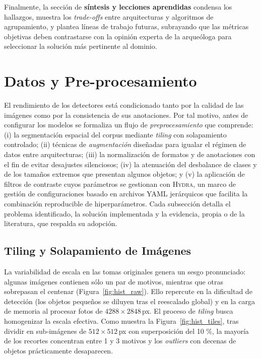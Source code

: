 Finalmente, la sección de \textbf{síntesis y lecciones aprendidas} condensa los hallazgos, muestra los \emph{trade-offs} entre arquitecturas y algoritmos de agrupamiento, y plantea líneas de trabajo futuras, subrayando que las métricas objetivas deben contrastarse con la opinión experta de la arqueóloga para seleccionar la solución más pertinente al dominio.
\section{Datos y Pre-procesamiento}\label{sec:datos}

El rendimiento de los detectores está condicionado tanto por la calidad de las imágenes como por la consistencia de sus anotaciones.
Por tal motivo, antes de configurar los modelos se formaliza un flujo de \textit{preprocesamiento} que comprende:
(i) la segmentación espacial del corpus mediante \emph{tiling} con solapamiento controlado;
(ii) técnicas de \emph{augmentación} diseñadas para igualar el régimen de datos entre arquitecturas;
(iii) la normalización de formatos y de anotaciones con el fin de evitar desajustes silenciosos;
(iv) la atenuación del desbalance de clases y de los tamaños extremos que presentan algunos objetos;
y (v) la aplicación de filtros de contraste cuyos parámetros se gestionan con \textsc{Hydra}, un marco de gestión de configuraciones basado en archivos YAML jerárquicos que facilita la combinación reproducible de hiperparámetros.
Cada subsección detalla el problema identificado, la solución implementada y la evidencia, propia o de la literatura, que respalda su adopción.


\subsection{Tiling y Solapamiento de Imágenes}\label{ssec:tiling}

La variabilidad de escala en las tomas originales genera un sesgo pronunciado: algunas imágenes contienen sólo un par de motivos, mientras que otras sobrepasan el centenar (Figura~\ref{fig:hist_raw}).
Ello repercute en la dificultad de detección (los objetos pequeños se diluyen tras el reescalado global) y en la carga de memoria al procesar fotos de \(4288\times2848\)\,px.
El proceso de \emph{tiling} busca homogenizar la escala efectiva.
Como muestra la Figura~\ref{fig:hist_tiles}, tras dividir en sub‐imágenes de \(512\times512\)\,px con superposición del 10 \%, la mayoría de los recortes concentran entre 1 y 3 motivos y los \emph{outliers} con decenas de objetos prácticamente desaparecen.


